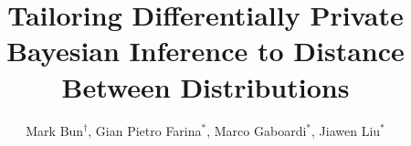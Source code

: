\documentclass[final,hyperref={pdfpagelabels=false}]{beamer}
\title{\LARGE Tailoring Differentially Private Bayesian Inference to Distance Between Distributions} %
\author{Mark Bun$^\dag$,
Gian Pietro Farina$^{*}$,
Marco Gaboardi$^{*}$,
Jiawen Liu$^{*}$
}
\institute{$^\dag$Princeton University, $^{*}$University at Buffalo, SUNY} %
\begin{document}
\begin{frame}[t] %

\begin{columns}[t] %

\begin{column}{.015\textwidth}\end{column} %

\begin{column}{.485\textwidth} %



\end{column}
\end{columns}
\end{frame}
\end{document}
